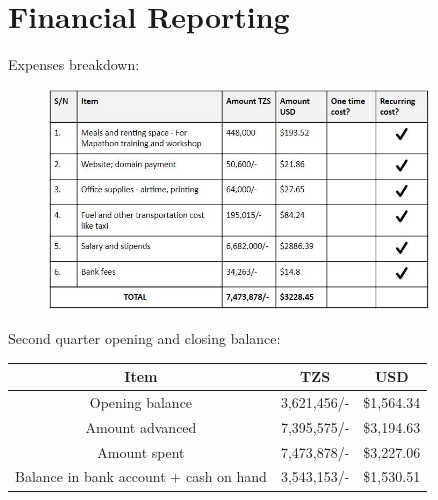 \documentclass[a4paper,12pt,twoside]{article}
\begin{document}
\section{Financial Reporting}
Expenses breakdown:
\begin{figure}[h]
    \centering
    \includegraphics[width=0.9\textwidth]{images/finance.JPG}
\end{figure}


Second quarter opening and closing balance:
\begin{center}
	\begin{tabular}{|c|c|c|}
		\hline
		Item & TZS & USD \\
		\hline
		\rowcolor{Gray}
		Opening balance & 3,621,456/- & \$1,564.34 \\
	
		Amount advanced & 7,395,575/- & \$3,194.63 \\
		
		\rowcolor{Gray}
		Amount spent & 7,473,878/- & \$3,227.06 \\
		
		Balance in bank account + cash on hand & 3,543,153/- & \$1,530.51 \\
		\hline
	\end{tabular}
\end{center}
\end{document}
